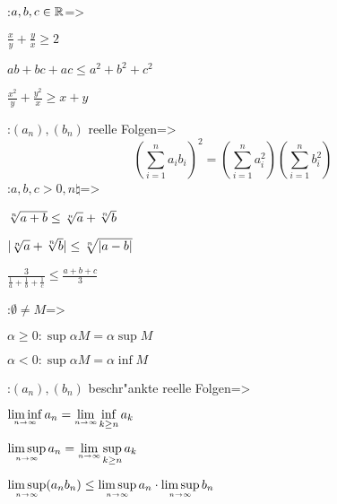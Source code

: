 
\theorem:$a,b,c\in\mathbb R$=>{
  \begin{stmts}
    \item $\frac x y+\frac y x\ge 2$
    \item $ab+bc+ac \le a^2+b^2+c^2$
    \item $\frac {x^2} y+\frac {y^2}x \ge x+y$
    \end{stmts}
  }
\theorem:$(a_n),(b_n)$ reelle Folgen=>{
  \[\left(\sum_{i=1}^n a_i b_i \right)^2=
    \left(\sum_{i=1}^n a_i^2 \right)
    \left(\sum_{i=1}^n b_i^2 \right)
    \]
  }
\theorem:$a,b,c>0,n\natural$=>{
  \begin{stmts}
    \item $\root n \of{a+b} \le \root n\of a+\root n \of b$
    \item $|\root n\of a+\root n \of b|\le \root n \of {|a-b|}$
    \item $\frac 3 {\frac 1 a+\frac 1 b+\frac 1 c}\le \frac {a+b+c} 3$
    \end{stmts}
  }
\theorem:$\emptyset\ne M$=>{
  \begin{stmts}
    \item $\alpha\ge 0: \sup \alpha M=\alpha\sup M$ 
    \item $\alpha<0: \sup \alpha M=\alpha\inf M$
    \end{stmts}
  }
\theorem:$(a_n),(b_n)$ beschr"ankte reelle Folgen=>{
  \begin{stmts}
    \item $\liminfn a_n=\limn\inf\limits_{k\ge n} a_k$ 
    \item $\limsupn a_n=\limn\sup\limits_{k\ge n} a_k$ 
    \item $\limsupn (a_n b_n)\le\limsupn a_n\cdot\limsupn b_n$ 
    \end{stmts}
  }
